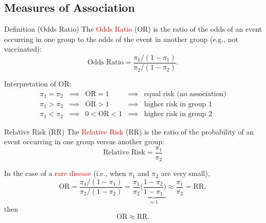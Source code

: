 \documentclass{article}\usepackage[]{graphicx}\usepackage[svgnames]{xcolor}
\newcommand{\OR}{\text{OR}}%
\newcommand{\RR}{\text{RR}}%
\begin{document}
\subsection*{Measures of Association}
\begin{Regular}{Definition (Odds Ratio)}
    The \textcolor{Red}{Odds Ratio} (OR) is the ratio of the odds of an event occurring in one
    group to the odds of the event in another group (e.g., not vaccinated):
    \[ \text{Odds Ratio}=\frac{\pi_1/(1-\pi_1)}{\pi_2/(1-\pi_2)}. \]
\end{Regular}
Interpretation of OR:
\[ \begin{array}{ccccc}
        \pi_1=\pi_2 & \implies & \OR=1   & \implies & \text{equal risk (no association)} \\
        \pi_1>\pi_2 & \implies & \OR>1   & \implies & \text{higher risk in group 1}      \\
        \pi_1<\pi_2 & \implies & 0<\OR<1 & \implies & \text{higher risk in group 2}
    \end{array} \]
\begin{Regular}{Relative Risk (RR)}
    The \textcolor{Red}{Relative Risk} (RR) is the ratio of the probability of an event occurring in one group versus another group:
    \[ \text{Relative Risk}=\frac{\pi_1}{\pi_2} \]
\end{Regular}
In the case of a \textcolor{Red}{rare disease} (i.e., when $ \pi_1 $ and $ \pi_2 $ are very small),
\[ \OR=\frac{\pi_1/(1-\pi_1)}{\pi_2/(1-\pi_2)}=\frac{\pi_1}{\pi_2}\underbrace{\biggl(\frac{1-\pi_2}{1-\pi_1}\biggr)}_{\approx 1}\approx \frac{\pi_1}{\pi_2} =\RR,  \]
then
\[ \OR\approx\RR. \]
\end{document}
